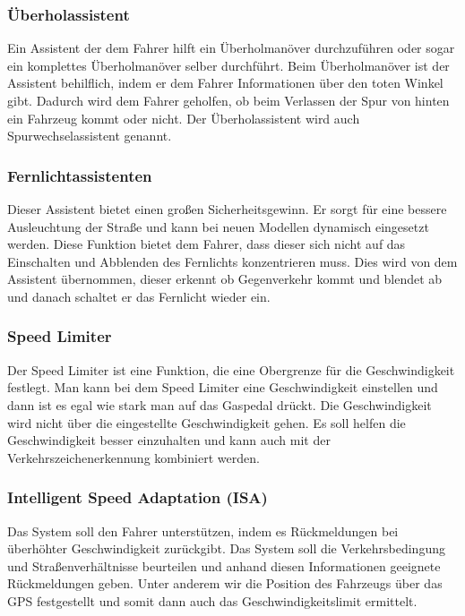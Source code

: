         \subsubsection{Überholassistent}
        Ein Assistent der dem Fahrer hilft ein Überholmanöver durchzuführen oder sogar ein
        komplettes Überholmanöver selber durchführt. Beim Überholmanöver ist der Assistent 
        behilflich, indem er dem Fahrer Informationen über den toten Winkel gibt. Dadurch 
        wird dem Fahrer geholfen, ob beim Verlassen der Spur von hinten ein Fahrzeug kommt 
        oder nicht. Der Überholassistent wird auch Spurwechselassistent genannt.
        \cite{ueberholassi.PB1} \cite{spurwechsel.PB1} \cite{assistenzsysteme.PB1} 
        \cite{assistenzsysteme.PB2}
        
        \subsubsection{Fernlichtassistenten}
        Dieser Assistent bietet einen großen Sicherheitsgewinn. Er sorgt für eine bessere
        Ausleuchtung der Straße und kann bei neuen Modellen dynamisch eingesetzt werden.
        Diese Funktion bietet dem Fahrer, dass dieser sich nicht auf das Einschalten und
        Abblenden des Fernlichts konzentrieren muss. Dies wird von dem Assistent übernommen,
        dieser erkennt ob Gegenverkehr kommt und blendet ab und danach schaltet er das Fernlicht
        wieder ein.
        \cite{assistenzsysteme.PB2} \cite{Audi.PB1}

        \subsubsection{Speed Limiter}
        Der Speed Limiter ist eine Funktion, die eine Obergrenze für die Geschwindigkeit festlegt.
        Man kann bei dem Speed Limiter eine Geschwindigkeit einstellen 
        und dann ist es egal wie stark man auf das Gaspedal drückt. Die Geschwindigkeit wird nicht 
        über die eingestellte Geschwindigkeit gehen. Es soll helfen die Geschwindigkeit besser 
        einzuhalten und kann auch mit der Verkehrszeichenerkennung kombiniert werden.
        \cite{assistenzsysteme.PB2}

        \subsubsection{Intelligent Speed Adaptation (ISA)}
        Das System soll den Fahrer unterstützen, indem es Rückmeldungen bei überhöhter Geschwindigkeit
        zurückgibt. Das System soll die Verkehrsbedingung und Straßenverhältnisse beurteilen und
        anhand diesen Informationen geeignete Rückmeldungen geben. Unter anderem wir die Position des 
        Fahrzeugs über das GPS festgestellt und somit dann auch das Geschwindigkeitslimit ermittelt.
        \cite{ISA.PB1}  \cite{speedlimiter.PB1} \cite{ISA.PB2}

